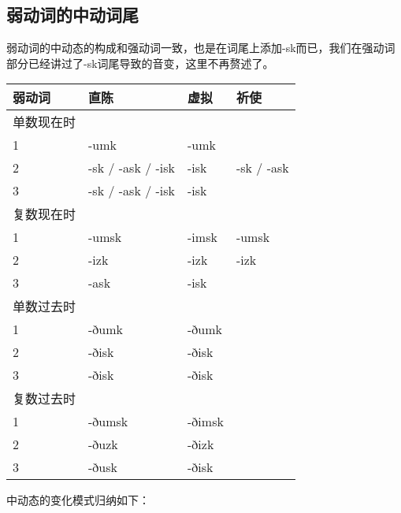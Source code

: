 \subsection{弱动词的中动词尾}\label{弱动词的中动词尾}

弱动词的中动态的构成和强动词一致，也是在词尾上添加-sk而已，我们在强动词部分已经讲过了-sk词尾导致的音变，这里不再赘述了。

\begin{longtable}{llll}
  \toprule
  弱动词   & 直陈                & 虚拟     & 祈使         \\
  \midrule
  \endhead
  \bottomrule
  \endfoot
  单数现在时 &                   &        &            \\
  1     & -umk              & -umk   &            \\
  2     & -sk / -ask / -isk & -isk   & -sk / -ask \\
  3     & -sk / -ask / -isk & -isk   &            \\
  复数现在时 &                   &        &            \\
  1     & -umsk             & -imsk  & -umsk      \\
  2     & -izk              & -izk   & -izk       \\
  3     & -ask              & -isk   &            \\
  单数过去时 &                   &        &            \\
  1     & -ðumk             & -ðumk  &            \\
  2     & -ðisk             & -ðisk  &            \\
  3     & -ðisk             & -ðisk  &            \\
  复数过去时 &                   &        &            \\
  1     & -ðumsk            & -ðimsk &            \\
  2     & -ðuzk             & -ðizk  &            \\
  3     & -ðusk             & -ðisk  &            \\
\end{longtable}

中动态的变化模式归纳如下：

